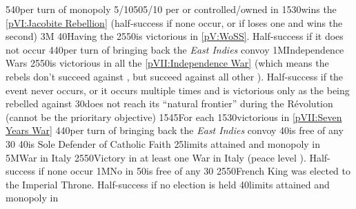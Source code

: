 %
%
{5}{40}{per turn of  monopoly}%
%
%
%
{5/10}{50}{5/10 \VPs per \TP or \COL controlled/owned in \continentCaraibes}%
%
%
{15}{30}{\ANG wins the \ref{pVI:Jacobite Rebellion} (half-success if none
  occur, or if loses one and wins the second)}%
%
\EUobjective3M{}{}%
{}{40}{Having the }%
%
%
{25}{50}{\ANG is victorious in \ref{pV:WoSS}. Half-success if it does not
  occur}%
%
%
{4}{40}{per turn of bringing back the \emph{East Indies} convoy}%
%
%
\EUobjective1M{Independence Wars}{}%
{25}{50}{\ANG is victorious in all the \ref{pVII:Independence War} (which
  means the rebels don't succeed against \ANG, but succeed against all other
  \MAJ). Half-success if the event never occurs, or it occurs multiple times
  and \ANG is victorious only as the \MAJ being rebelled against }%
%
%
{}{30}{\paysmajeurFrance does not reach its ``natural frontier'' during the
  Révolution (cannot be the prioritary objective)}%
%
%
{15}{45}{For each }%
%
%
{15}{30}{\ANG victorious in \ref{pVII:Seven Years War}}%
%
%
{4}{40}{per turn of bringing back the \emph{East Indies} convoy}%
%
%
%
 
%
%
{}{40}{\provincePicardie is free of any \Presidio}%
%
%
%
{}{30}{}%
%
%
{}{40}{\FRA is Sole Defender of Catholic Faith}%
%
%
{}{25}{\MNU limits attained and monopoly in }%
%
%
\EUobjective5M{War in Italy}{}%
{25}{50}{Victory in at least one War in Italy (peace level ). Half-success if none occur}%
%
%
\EUobjective1M{No \Presidio in \provincePicardie}{}%
{}{50}{\provincePicardie is free of any \Presidio}%
%
%
{}{30}{}%
%
%
{25}{50}{French King was elected to the Imperial Throne. Half-success if no
  election is held}%
%
%
{}{40}{\MNU limits attained and monopoly in }%
%
%
